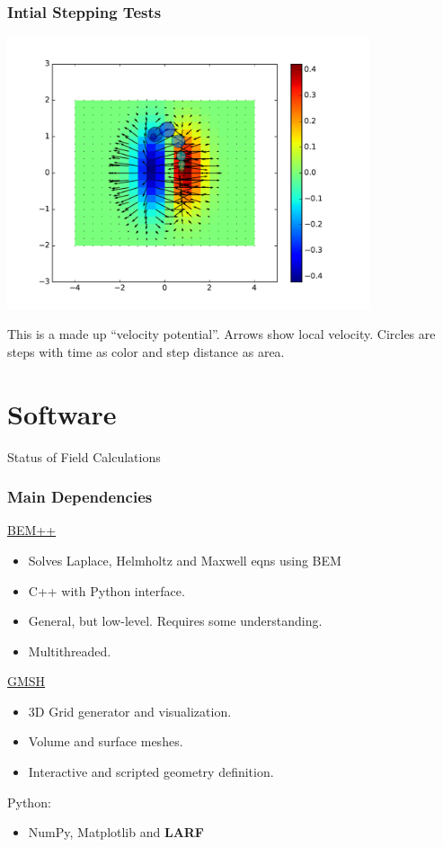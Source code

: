 \documentclass[xcolor=dvipsnames]{beamer}
\begin{document}
\begin{frame}
  \frametitle{Intial Stepping Tests}
  \begin{center}
    \includegraphics[width=0.8\textwidth]{initial_stepping_test2.pdf}    
  \end{center}

  \scriptsize
  This is a made up ``velocity potential''.  Arrows show local
  velocity.  Circles are steps with time as color and step distance as
  area.

\end{frame}



\section{Software}

\begin{frame}{Status of Field Calculations}
  \tableofcontents[currentsection]
\end{frame}

\begin{frame}
  \frametitle{Main Dependencies}

  \href{http://www.bempp.org/}{BEM++}
  \begin{itemize}
  \item Solves Laplace, Helmholtz and Maxwell eqns using BEM
  \item C++ with Python interface.
  \item General, but low-level.  Requires some understanding.
  \item Multithreaded.
  \end{itemize}

  \href{http://gmsh.info}{GMSH}
  \begin{itemize}
  \item 3D Grid generator and visualization.
  \item Volume and surface meshes.
  \item Interactive and scripted geometry definition.
  \end{itemize}

  Python:
  \begin{itemize}
  \item NumPy, Matplotlib and \textbf{LARF}
  \end{itemize}
\end{frame}
\end{document}
